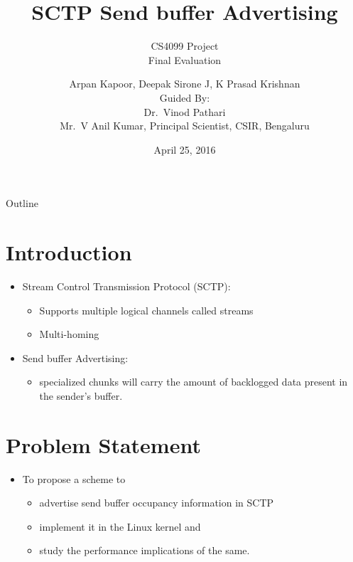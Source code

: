 \documentclass{beamer}
\title{SCTP Send buffer Advertising}
\subtitle{CS4099 Project\\
  Final Evaluation}
\author{Arpan Kapoor, Deepak Sirone J, K Prasad Krishnan\\
  Guided By:\\ Dr.~Vinod Pathari\\
  Mr.~V Anil Kumar, Principal Scientist, CSIR, Bengaluru}
\date{April 25, 2016}
\begin{document}
\begin{frame}
  \titlepage
\end{frame}

\begin{frame}{Outline}
  \tableofcontents
\end{frame}

\section{Introduction}
\begin{frame}{\insertsection}

\begin{itemize}
  \item Stream Control Transmission Protocol (SCTP):
  \begin{itemize}
    \item Supports multiple logical channels called streams
    \item Multi-homing
  \end{itemize}
\end{itemize}

\begin{itemize}
  \item Send buffer Advertising:
  \begin{itemize}
    \item specialized chunks will carry the amount of backlogged data
      present in the sender's buffer.
  \end{itemize}
\end{itemize}

\end{frame}

\section{Problem Statement}
\begin{frame}{\insertsection}
  \begin{itemize}
    \item To propose a scheme to
      \begin{itemize}
        \item advertise send buffer occupancy information in SCTP
        \item implement it in the Linux kernel and
        \item study the performance implications of the same.
      \end{itemize}
  \end{itemize}
\end{frame}
\end{document}
